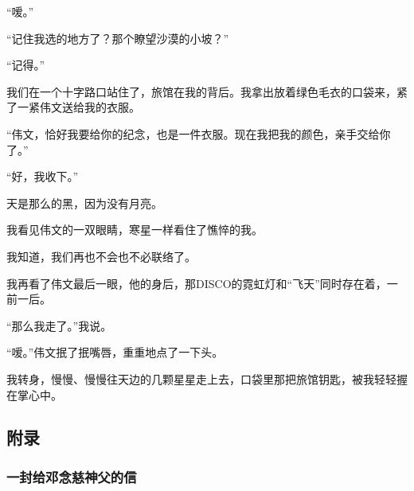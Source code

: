\par “嗳。”
\par “记住我选的地方了？那个瞭望沙漠的小坡？”
\par “记得。”
\par 我们在一个十字路口站住了，旅馆在我的背后。我拿出放着绿色毛衣的口袋来，紧了一紧伟文送给我的衣服。
\par “伟文，恰好我要给你的纪念，也是一件衣服。现在我把我的颜色，亲手交给你了。”
\par “好，我收下。”
\par 天是那么的黑，因为没有月亮。
\par 我看见伟文的一双眼睛，寒星一样看住了憔悴的我。
\par 我知道，我们再也不会也不必联络了。
\par 我再看了伟文最后一眼，他的身后，那DISCO的霓虹灯和“飞天”同时存在着，一前一后。
\par “那么我走了。”我说。
\par “嗳。”伟文抿了抿嘴唇，重重地点了一下头。
\par 我转身，慢慢、慢慢往天边的几颗星星走上去，口袋里那把旅馆钥匙，被我轻轻握在掌心中。


\subsection{附录}


\subsubsection{一封给邓念慈神父的信}

